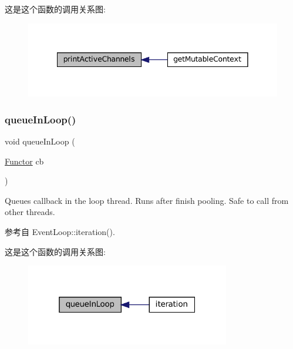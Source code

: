 这是这个函数的调用关系图\+:
\nopagebreak
\begin{figure}[H]
\begin{center}
\leavevmode
\includegraphics[width=341pt]{classmuduo_1_1net_1_1EventLoop_aab9db454f555ffd9944fcd782e334d89_icgraph}
\end{center}
\end{figure}
\mbox{\label{classmuduo_1_1net_1_1EventLoop_a82dadba8c4b9a3efafdc78c5c21f85df}} 
\subsubsection{\texorpdfstring{queue\+In\+Loop()}{queueInLoop()}}
{\footnotesize\ttfamily void queue\+In\+Loop (\begin{DoxyParamCaption}\item[{\hyperlink{classmuduo_1_1net_1_1EventLoop_a322d335989ca5098875638110aafba84}{Functor}}]{cb }\end{DoxyParamCaption})}

Queues callback in the loop thread. Runs after finish pooling. Safe to call from other threads. 

参考自 Event\+Loop\+::iteration().

这是这个函数的调用关系图\+:
\nopagebreak
\begin{figure}[H]
\begin{center}
\leavevmode
\includegraphics[width=253pt]{classmuduo_1_1net_1_1EventLoop_a82dadba8c4b9a3efafdc78c5c21f85df_icgraph}
\end{center}
\end{figure}
\mbox{\label{classmuduo_1_1net_1_1EventLoop_a0eff42734d64323acbd2e676bcd27b76}} 
